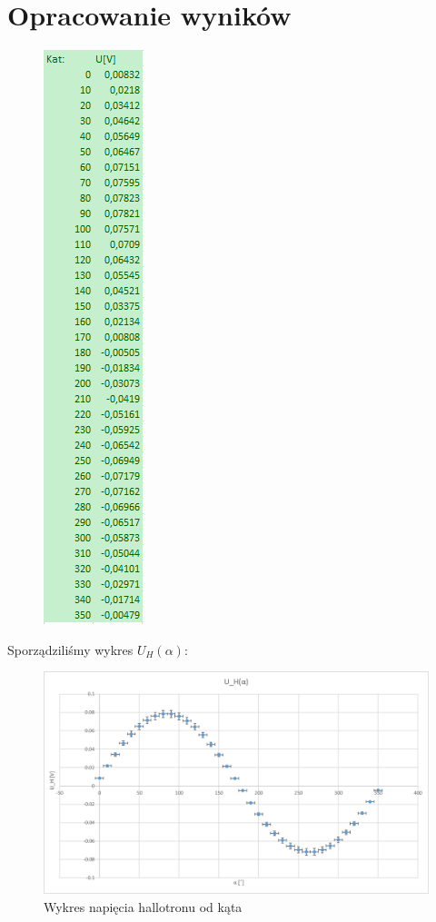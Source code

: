 \documentclass{article}
\begin{document}
\newpage

\section{Opracowanie wyników}
\begin{figure}[h]
    \centering
    \includegraphics[scale=0.5]{pak.png}
    \label{fig:rys2}
\end{figure}
Sporządziliśmy wykres $U_{H}(\alpha)$:
\begin{figure}[h]
    \centering
    \includegraphics{U_H_od_ALFA.png}
    \caption{Wykres napięcia hallotronu od kąta}
    \label{fig:rys3}
\end{figure}
\end{document}
